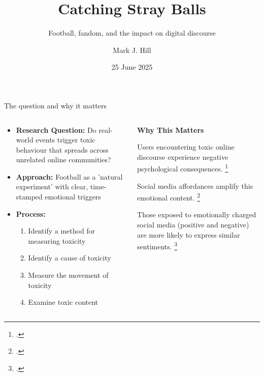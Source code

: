 \documentclass[10pt]{beamer}
\title{Catching Stray Balls}
\subtitle{Football, fandom, and the impact on digital discourse}
\date{25 June 2025}
\author{Mark J. Hill}
\institute{Department of Digital Humanities, KCL}
\begin{document}
\maketitle


\begin{frame}{The question and why it matters}

\begin{columns}
\begin{column}{0.55\textwidth}
\begin{itemize}
\item \textbf{Research Question:}
Do real-world events trigger toxic behaviour that spreads across unrelated online communities?
\item \textbf{Approach:} Football as a 'natural experiment' with clear, time-stamped emotional triggers

\item \textbf{Process:}
{\small
    \begin{enumerate}
    \item Identify a method for measuring toxicity
    \item Identify a cause of toxicity
    \item Measure the movement of toxicity
    \item Examine toxic content
    \end{enumerate}
}

\end{itemize}
\end{column}

\begin{column}{0.55\textwidth}
\textbf{Why This Matters}
\item Users encountering toxic online discourse experience negative psychological consequences. \footcite{braghieri_social_2022, allcott_welfare_2020}
\item Social media affordances amplify this emotional content. \footcite{milli_engagement_2025, kramer_experimental_2014, tsugawa_negative_2015} 
\item Those exposed to emotionally charged social media (positive and negative) are more likely to express similar sentiments. \footcite{ferrara_measuring_2015, Brady_2017}

\end{column}
\end{columns}
\end{frame}

\end{document}
